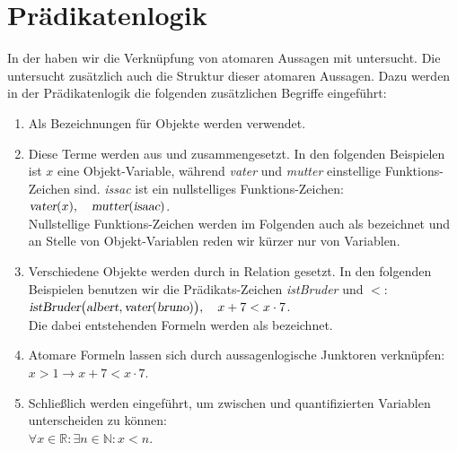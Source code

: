 \chapter{Prädikatenlogik}
In der  haben wir die Verknüpfung von atomaren Aussagen mit  untersucht.
Die  untersucht zusätzlich auch die Struktur dieser atomaren Aussagen.  Dazu werden in der
Prädikatenlogik die folgenden zusätzlichen Begriffe eingeführt:
\begin{enumerate}
\item Als Bezeichnungen für Objekte werden  verwendet.
\item Diese Terme werden aus  und 
      zusammengesetzt.  In den folgenden Beispielen ist $x$ eine Objekt-Variable, während
      \textsl{vater} und \textsl{mutter} einstellige Funktions-Zeichen
      sind. \textsl{issac} ist ein nullstelliges Funktions-Zeichen:
      \\[0.2cm]
      \hspace*{1.3cm}
      $\textsl{vater}(x),\quad \textsl{mutter}(\textsl{isaac})$.
      \\[0.2cm]
      Nullstellige Funktions-Zeichen werden im Folgenden auch als  bezeichnet
      und an Stelle von Objekt-Variablen reden wir kürzer nur von Variablen.
\item Verschiedene Objekte werden durch  in Relation gesetzt.
      In den folgenden Beispielen benutzen wir die Prädikats-Zeichen \textsl{istBruder} und $<$:
      \\[0.2cm]
      \hspace*{1.3cm}
      $\textsl{istBruder}\bigl(\textsl{albert}, \textsl{vater}(\textsl{bruno})\bigr),\quad x+7 < x\cdot 7$.
      \\[0.2cm]
      Die dabei entstehenden Formeln werden als   bezeichnet.
\item Atomare Formeln lassen sich durch aussagenlogische Junktoren verknüpfen:
      \\[0.2cm]
      \hspace*{1.3cm}
      $x > 1 \rightarrow x + 7 < x \cdot  7$.
\item Schließlich werden  eingeführt, um zwischen  und
       quantifizierten Variablen unterscheiden
      zu können:
      \\[0.2cm]
      \hspace*{1.3cm}
      $\forall x \in \mathbb{R}: \exists n \in \mathbb{N}: x < n$.
\end{enumerate}
